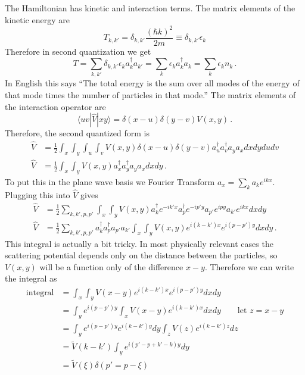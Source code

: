 \documentclass{article}
\begin{document}
The Hamiltonian has kinetic and interaction terms.
The matrix elements of the kinetic energy are
\begin{equation}
T_{k,k'} = \delta_{k,k'} \frac{\left(\hbar k\right)^{2}}{2m} \equiv \delta_{k,k'} \epsilon_{k}
\end{equation}
Therefore in second quantization we get
\begin{equation}
T = \sum_{k,k'}\delta_{k,k'}\epsilon_{k}a_{k}^{\dagger}a_{k'}
= \sum_{k} \epsilon_{k}a_{k}^{\dagger}a_{k}=\sum_{k}\epsilon_{k}n_{k} \, .
\end{equation}
In English this says ``The total energy is the sum over all modes of the energy of that mode times the number of particles in that mode.''
The matrix elements of the interaction operator are
\begin{equation}
\langle uv|\hat{V}|xy\rangle=\delta(x-u)\delta(y-v)V(x,y) \, .
\end{equation}
Therefore, the second quantized form is\begin{align}
\hat{V} & = \frac{1}{2} \int_{x} \int_{y} \int_{u} \int_{v} V(x,y) \delta(x-u) \delta(y-v) a_{u}^{\dagger} a_{v}^{\dagger} a_{y}a_{x} dxdydudv\\
\hat{V} & = \frac{1}{2}\int_{x}\int_{y}V(x,y)a_{x}^{\dagger}a_{y}^{\dagger}a_{y}a_{x}dxdy \, .
\end{align}
To put this in the plane wave basis we Fourier Transform $a_{x} = \sum_{k} a_{k} e^{ikx}$.
Plugging this into $\hat{V}$ gives
\begin{align}
\hat{V} & = \frac{1}{2} \sum_{k,k',p,p'} \int_{x} \int_{y} V(x,y) a_{k}^{\dagger} e^{-ik'x} a_{p}^{\dagger} e^{-ip'y} a_{p'} e^{ipy} a_{k'} e^{ikx} dxdy\\
\hat{V} & = \frac{1}{2} \sum_{k,k',p,p'} a_{k}^{\dagger} a_{p}^{\dagger} a_{p'} a_{k'} \int_{x} \int_{y} V(x,y) e^{i(k-k')x} e^{i(p-p')y} dxdy \, .
\end{align}
This integral is actually a bit tricky.
In most physically relevant cases the scattering potential depends only on the distance between the particles, so $V(x,y)$ will be a function only of the difference $x-y$.
Therefore we can write the integral as
\begin{align}
\textrm{integral} & = \int_{x}\int_{y}V(x-y)e^{i(k-k')x}e^{i(p-p')y}dxdy \\
& = \int_{y}e^{i(p-p')y}\int_{x}V(x-y)e^{i(k-k')x}dxdy \qquad \textrm{let }z = x-y \\
& = \int_{y}e^{i(p-p')y}e^{i(k-k')y}dy\int_{z}V(z)e^{i(k-k')z}dz\\
& = \tilde{V}(k-k')\int_{y}e^{i(p'-p+k'-k)y}dy\\
& = \tilde{V}(\xi)\delta(p'=p-\xi)
\end{align}
\end{document}
